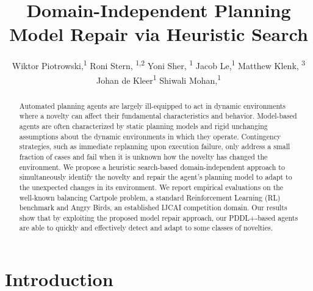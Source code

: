 \documentclass[letterpaper]{article} %
\title{Domain-Independent Planning Model Repair via Heuristic Search}
\author {
    Wiktor Piotrowski,\textsuperscript{\rm 1}
    Roni Stern, \textsuperscript{\rm 1,2}
    Yoni Sher, \textsuperscript{\rm 1}
    Jacob Le,\textsuperscript{\rm 1}
    Matthew Klenk, \textsuperscript{\rm 3}
    Johan de Kleer\textsuperscript{\rm 1}
    Shiwali Mohan,\textsuperscript{\rm 1}
}
\begin{document}
\maketitle

\begin{abstract}
Automated planning agents are largely ill-equipped to act in dynamic environments where a novelty can affect their fundamental characteristics and behavior. 
Model-based agents are often characterized by static planning models and rigid unchanging assumptions about the dynamic environments in which they operate. Contingency strategies, such as immediate replanning upon execution failure, only address a small fraction of cases and fail when it is unknown how the novelty has changed the environment. We propose a heuristic search-based domain-independent approach to simultaneously identify the novelty and repair the agent's planning model to adapt to the unexpected changes in its environment. We report empirical evaluations on the well-known balancing Cartpole problem, a standard Reinforcement Learning (RL) benchmark and Angry Birds, an established IJCAI competition domain. Our results show that by exploiting the proposed model repair approach, our PDDL+-based agents are able to quickly and effectively detect and adapt to some classes of novelties.
\end{abstract}

\section{Introduction}


\end{document}
